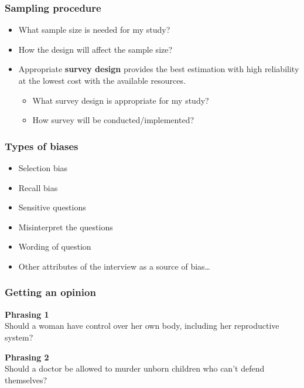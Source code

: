 \documentclass[a4paper]{article}\usepackage[]{graphicx}\usepackage[]{xcolor}
\begin{document}
\subsubsection{Sampling procedure}
\begin{itemize}
    \item What sample size is needed for my study?
    \item How the design will affect the sample size?
    \item Appropriate \textbf{survey design} provides the best estimation with high reliability at the lowest cost with the available resources.
    \begin{itemize}
        \item What survey design is appropriate for my study?
        \item How survey will be conducted/implemented?            
    \end{itemize}
\end{itemize}
\subsubsection{Types of biases}
\begin{itemize}
    \item Selection bias
    \item Recall bias
    \item Sensitive questions
    \item Misinterpret the questions
    \item Wording of question
    \item Other attributes of the interview as a source of bias…
\end{itemize}
\subsubsection{Getting an opinion}
\begin{greenbox}
	\textbf{Phrasing 1}\\
	Should a woman have control over her own body, including her reproductive system?
\end{greenbox}
\begin{greenbox}
	\textbf{Phrasing 2}\\
	Should a doctor be allowed to murder unborn children who can't defend themselves?
\end{greenbox}
\end{document}
